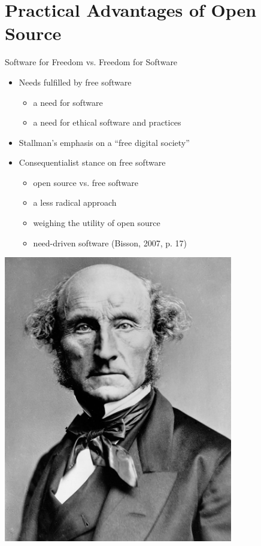 \section{Practical Advantages of Open Source}\frame{\sectionpage}

\begin{frame}{Software for Freedom vs. Freedom for Software}
\begin{minipage}{0.5\textwidth}
\begin{itemize}
  \item Needs fulfilled by free software
    \begin{itemize}
      \item a need for software
      \item a need for ethical software and practices
      \end{itemize}
   \item Stallman's emphasis on a ``free digital society''
   \item Consequentialist stance on free software
    \begin{itemize}
      \item open source vs. free software
      \item a less radical approach
      \item weighing the utility of open source
      \item need-driven software (Bisson, 2007, p. 17) 
    \end{itemize}
   \end{itemize}
\end{minipage}
\begin{minipage}{0.45\textwidth}
\includegraphics[width = 0.75\textwidth]{mill.jpg}
\end{minipage}
\end{frame}

